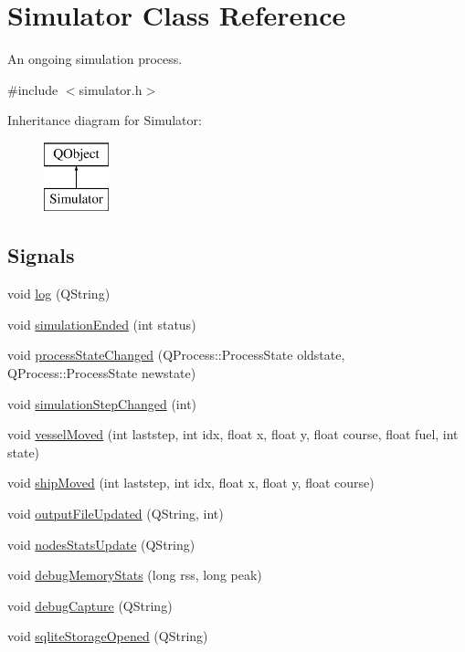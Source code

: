 \hypertarget{class_simulator}{}\section{Simulator Class Reference}
\label{class_simulator}


An ongoing simulation process.  




{\ttfamily \#include $<$simulator.\+h$>$}

Inheritance diagram for Simulator\+:\begin{figure}[H]
\begin{center}
\leavevmode
\includegraphics[height=2.000000cm]{dd/dd1/class_simulator}
\end{center}
\end{figure}
\subsection*{Signals}
\begin{DoxyCompactItemize}
\item 
void \mbox{\hyperlink{class_simulator_a3ed91c5cd518e0372a519c75d52b573e}{log}} (Q\+String)
\item 
void \mbox{\hyperlink{class_simulator_a7d91f3582160384e49a5986e002bc81a}{simulation\+Ended}} (int status)
\item 
void \mbox{\hyperlink{class_simulator_a3db10c90bcd5ba05ebfeeed1edf15b38}{process\+State\+Changed}} (Q\+Process\+::\+Process\+State oldstate, Q\+Process\+::\+Process\+State newstate)
\item 
void \mbox{\hyperlink{class_simulator_a607d820eb7bca0092853a3c861e57e70}{simulation\+Step\+Changed}} (int)
\item 
void \mbox{\hyperlink{class_simulator_a77be9f7ec64264d49c239fc3d5be2ef0}{vessel\+Moved}} (int laststep, int idx, float x, float y, float course, float fuel, int state)
\item 
void \mbox{\hyperlink{class_simulator_a26d53673251424dda5f581b9b6095a69}{ship\+Moved}} (int laststep, int idx, float x, float y, float course)
\item 
void \mbox{\hyperlink{class_simulator_a902b10cc29dc29eb70e5579d468ff043}{output\+File\+Updated}} (Q\+String, int)
\item 
void \mbox{\hyperlink{class_simulator_a7855777d75c25419c22a4ba67963bb12}{nodes\+Stats\+Update}} (Q\+String)
\item 
void \mbox{\hyperlink{class_simulator_afdd8bbc35c2a0e3957f2bca7d67237bd}{debug\+Memory\+Stats}} (long rss, long peak)
\item 
void \mbox{\hyperlink{class_simulator_a39861df2b7110b42c10a9c67b0cf126c}{debug\+Capture}} (Q\+String)
\item 
void \mbox{\hyperlink{class_simulator_acd0f25e166cedfd96ec737b4375f7cc3}{sqlite\+Storage\+Opened}} (Q\+String)
\end{DoxyCompactItemize}
